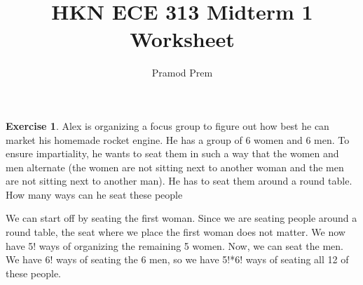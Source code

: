 \documentclass[12pt]{amsart}
\title{HKN ECE 313 Midterm 1 Worksheet}
\author{Pramod Prem}
\theoremstyle{definition}
\newtheorem{exercise}{Exercise}
\numberwithin{equation}{section}
\theoremstyle{plain}
\begin{document}
\maketitle

\begin{exercise}
Alex is organizing a focus group to figure out how best he can market his homemade rocket engine. He has a group of 6 women and 6 men. To ensure impartiality, he wants to seat them in such a way that the women and men alternate (the women are not sitting next to another woman and the men are not sitting next to another man). He has to seat them around a round table. How many ways can he seat these people
\begin{answer}We can start off by seating the first woman. Since we are seating people around a round table, the seat where we place the first woman does not matter. We now have 5! ways of organizing the remaining 5 women. Now, we can seat the men. We have 6! ways of seating the 6 men, so we have 5!*6! ways of seating all 12 of these people.
\end{answer}
\end{exercise}

 
\end{document}
